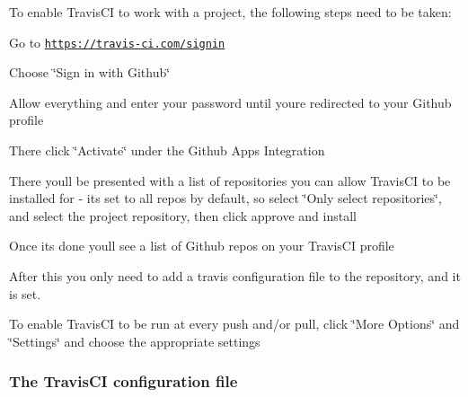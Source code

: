 To enable Travis\+CI to work with a project, the following steps need to be taken\+:
\begin{DoxyItemize}
\item Go to \href{https://travis-ci.com/signin}{\tt https\+://travis-\/ci.\+com/signin}
\item Choose \char`\"{}\+Sign in with Github\char`\"{}
\item Allow everything and enter your password until you\textquotesingle{}re redirected to your Github profile
\item There click \char`\"{}\+Activate\char`\"{} under the Github Apps Integration
\item There you\textquotesingle{}ll be presented with a list of repositories you can allow Travis\+CI to be installed for -\/ it\textquotesingle{}s set to all repos by default, so select \char`\"{}\+Only select repositories\char`\"{}, and select the project repository, then click approve and install
\item Once it\textquotesingle{}s done you\textquotesingle{}ll see a list of Github repos on your Travis\+CI profile
\item After this you only need to add a travis configuration file to the repository, and it is set.
\item To enable Travis\+CI to be run at every push and/or pull, click \char`\"{}\+More Options\char`\"{} and \char`\"{}\+Settings\char`\"{} and choose the appropriate settings
\end{DoxyItemize}

\subsubsection*{The Travis\+CI configuration file}


